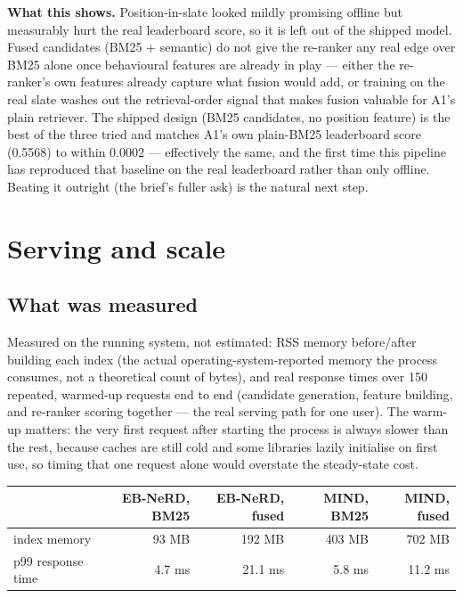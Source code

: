 \documentclass[11pt,a4paper]{article}
\begin{document}
\textbf{What this shows.} Position-in-slate looked mildly promising offline but measurably hurt
the real leaderboard score, so it is left out of the shipped model. Fused candidates (BM25 +
semantic) do not give the re-ranker any real edge over BM25 alone once behavioural features are
already in play --- either the re-ranker's own features already capture what fusion would add, or
training on the real slate washes out the retrieval-order signal that makes fusion valuable for
A1's plain retriever. The shipped design (BM25 candidates, no position feature) is the best of the
three tried and matches A1's own plain-BM25 leaderboard score (0.5568) to within 0.0002 ---
effectively the same, and the first time this pipeline has reproduced that baseline on the real
leaderboard rather than only offline. Beating it outright (the brief's fuller ask) is the natural
next step.

\section{Serving and scale}
\label{sec:q4}

\subsection{What was measured}

Measured on the running system, not estimated: RSS memory before/after building each index (the
actual operating-system-reported memory the process consumes, not a theoretical count of bytes),
and real response times over 150 repeated, warmed-up requests end to end (candidate generation,
feature building, and re-ranker scoring together --- the real serving path for one user). The
warm-up matters: the very first request after starting the process is always slower than the rest,
because caches are still cold and some libraries lazily initialise on first use, so timing that
one request alone would overstate the steady-state cost.

\begin{center}
\begin{tabular}{@{}lrrrr@{}}
\toprule
 & \textbf{EB-NeRD, BM25} & \textbf{EB-NeRD, fused} & \textbf{MIND, BM25} & \textbf{MIND, fused} \\
\midrule
index memory & 93 MB & 192 MB & 403 MB & 702 MB \\
p99 response time & 4.7 ms & 21.1 ms & 5.8 ms & 11.2 ms \\
\bottomrule
\end{tabular}
\end{center}
\end{document}
